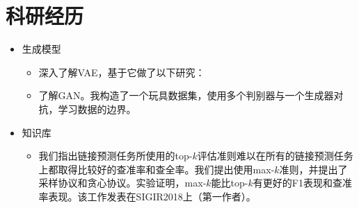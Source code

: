 \documentclass{resume}
\begin{document}

\section{科研经历}
\begin{itemize}
\item 生成模型
\begin{itemize}
	\item 深入了解VAE，基于它做了以下研究：
\item 了解GAN。我构造了一个玩具数据集，使用多个判别器与一个生成器对抗，学习数据的边界。
\end{itemize}

\item 知识库
\begin{itemize}

\item 我们指出链接预测任务所使用的top-$k$评估准则难以在所有的链接预测任务上都取得比较好的查准率和查全率。我们提出使用max-$k$准则，并提出了采样协议和贪心协议。实验证明，max-$k$能比top-$k$有更好的F1表现和查准率表现。该工作发表在SIGIR2018上（第一作者）。



\end{itemize}

\end{itemize}
\end{document}
